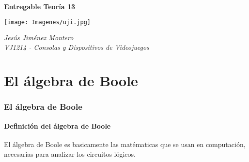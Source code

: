 \documentclass[12pt]{article}
\begin{document}
	\nocite{namesans_about}
	\nocite{namesans}
	\nocite{namemono}
	\nocite{atkinson}
	\nocite{circuitverse}
	\nocite{chatgpt}
	\nocite{duke}
	\nocite{texstudio}

\begin{titlepage}
	\begin{center}
		{\Huge \textbf{Entregable Teoría 13}}

		\vspace{2cm}

		\texttt{[image: Imagenes/uji.jpg]}

		\vspace{2cm}

		{\Large \textit{Jesús Jiménez Montero}}\\
		\vspace{1cm}
		{\Large \textit{VJ1214 - Consolas y Dispositivos de Videojuegos}}\\

		\vspace{2cm}
	\end{center}
\end{titlepage}

	\newpage
	\renewcommand{\contentsname}{Tabla de contenidos}
	\setcounter{secnumdepth}{5}
	\tableofcontents
	\setcounter{tocdepth}{4}
	\newpage



		\part{El álgebra de Boole}
		\section{El álgebra de Boole}

		\subsection{Definición del álgebra de Boole \texorpdfstring{\cite{floyd_fundamentos_2006} \cite{logic_gate} \cite{puerta_logica}}{}}
		El álgebra de Boole es basicamente las matématicas que se usan en computación, necesarias para analizar los circuitos lógicos.
\end{document}
